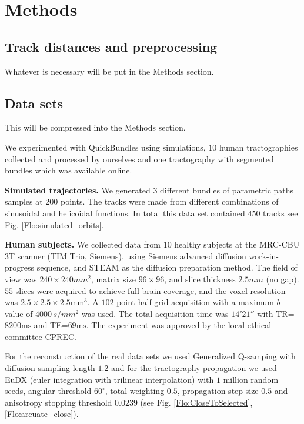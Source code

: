 \documentclass[preprint,authoryear,a4paper,10pt,onecolumn]{elsarticle}
\begin{document}
\section{Methods}

\subsection{\label{sub:track-distances}Track distances and preprocessing}

Whatever is necessary will be put in the Methods section.

\subsection{Data sets\label{sub:QB-Data-sets}}

This will be compressed into the Methods section.

We experimented with QuickBundles using simulations, $10$ human
tractographies collected and processed by ourselves and one tractography
with segmented bundles which was available online.

\textbf{Simulated trajectories.} We generated $3$ different bundles of
parametric paths samples at $200$ points. The tracks were made from
different combinations of sinusoidal and helicoidal functions.  In total
this data set contained $450$ tracks see Fig. \ref{Flo:simulated_orbits}.

\textbf{Human subjects. }We collected data from $10$ healthy subjects at
the MRC-CBU 3T scanner (TIM Trio, Siemens), using Siemens advanced
diffusion work-in-progress sequence, and STEAM
\cite{merboldt1992diffusion,MAB04} as the diffusion preparation
method. The field of view was $240\times240mm^{2}$, matrix size
$96\times96$, and slice thickness $2.5mm$ (no gap).  $55$ slices were
acquired to achieve full brain coverage, and the voxel resolution was
$2.5\times2.5\times2.5\textrm{mm}{}^{3}$. A $102$-point half grid
acquisition\cite{Yeh2010} with a maximum $b$-value of $4000\, s/mm^{2}$
was used. The total acquisition time was $14'21''$ with
TR=$8200\textrm{ms}$ and TE=$69\textrm{ms}$. The experiment was approved
by the local ethical committee CPREC.

For the reconstruction of the real data sets we used Generalized
Q-samping with diffusion sampling length $1.2$ and for the tractography
propagation we used EuDX (euler integration with trilinear
interpolation) with $1$ million random seeds, angular threshold
$60^{\circ}$, total weighting $0.5$, propagation step size $0.5$ and
anisotropy stopping threshold $0.0239$ (see
Fig. \ref{Flo:CloseToSelected},\ref{Flo:arcuate_close}).
\end{document}
